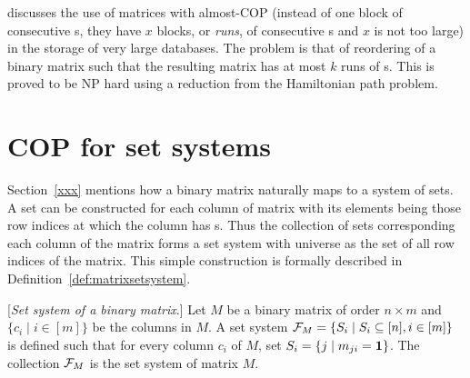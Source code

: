 {\cite{jkckv04} discusses the use of matrices with almost-COP (instead
of one block of consecutive {\un}s, they have $x$ blocks, or {\em
  runs}, of consecutive {\un}s and $x$ is not too large) in the
storage of very large databases.  The problem is that of reordering of
a binary matrix such that the resulting matrix has at most $k$ runs of
{\un}s. This is proved to be NP hard using a reduction from the
Hamiltonian path problem.    


}

\section{COP for set systems}
\label{sec:surveycertalgo}

Section~\ref{xxx} mentions how a binary matrix naturally maps to a
system of sets.  A set can be constructed for each column of matrix
with its elements being those row indices at which the column has \un
s. Thus the collection of sets corresponding each column of the matrix
forms a set system with universe as the set of all row indices of the
matrix.  This simple construction is formally described in
Definition~\ref{def:matrixsetsystem}.

\begin{definition}%
  \label{def:matrixsetsystem}%
  [\emph{Set system of a binary matrix}.] Let $M$ be a binary matrix
  of order $n \times m$ %
  and $\{c_i \mid i \in [m]\}$ be the columns in $M$. A set system
  ${\cal F}_{M} = \{S_i \mid S_i \subseteq [n], i \in [m]\}$ is defined
  such that for every column $c_i$ of $M$, set $S_i = \{j \mid m_{ji}
  = \textbf{1} \}$. The collection ${\cal F}_M$ is the set system of matrix $M$.
\end{definition}


